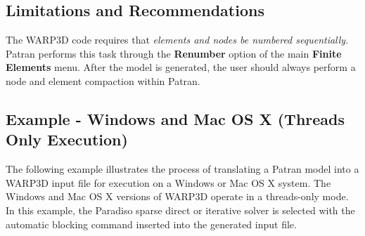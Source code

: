 \documentclass[11pt]{report}
\numberwithin{equation}{section}
\begin{document}
\subsection{Limitations and Recommendations}
\noindent The WARP3D code requires that \textit{elements and nodes be numbered sequentially}.
Patran performs this task through the \textbf{Renumber} option of the main \textbf{Finite
Elements} menu. After the model is generated, the user should always perform a
node and element compaction within Patran.

\subsection{Example - Windows and Mac OS X (Threads Only Execution)}
\noindent The following example illustrates the process of translating a Patran model into
a WARP3D input file for execution on a Windows or Mac OS X system. The Windows and
Mac OS X versions of WARP3D
operate in a threads-only mode. In this example, the Paradiso sparse direct or
iterative solver is selected with the automatic blocking command inserted into 
the generated input file. 
\end{document}
